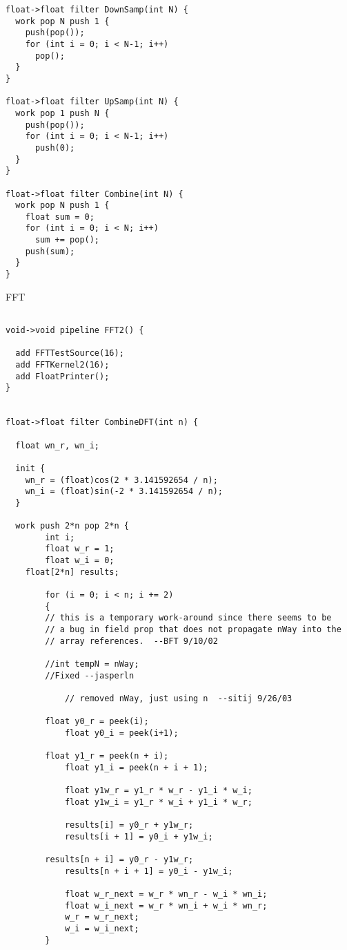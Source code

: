 \begin{scriptsize}
\begin{verbatim}
float->float filter DownSamp(int N) {
  work pop N push 1 {
    push(pop());
    for (int i = 0; i < N-1; i++)
      pop();
  }
}

float->float filter UpSamp(int N) {
  work pop 1 push N {
    push(pop());
    for (int i = 0; i < N-1; i++)
      push(0);
  }
}

float->float filter Combine(int N) {
  work pop N push 1 {
    float sum = 0;
    for (int i = 0; i < N; i++)
      sum += pop();
    push(sum);
  }
}

\end{verbatim}
\end{scriptsize}


FFT
\begin{scriptsize}
\begin{verbatim}

void->void pipeline FFT2() {

  add FFTTestSource(16);
  add FFTKernel2(16);
  add FloatPrinter();
}


float->float filter CombineDFT(int n) {

  float wn_r, wn_i;

  init {
    wn_r = (float)cos(2 * 3.141592654 / n);
    wn_i = (float)sin(-2 * 3.141592654 / n);
  }

  work push 2*n pop 2*n {
        int i;
        float w_r = 1;
        float w_i = 0;
    float[2*n] results;

        for (i = 0; i < n; i += 2)
        {
        // this is a temporary work-around since there seems to be
        // a bug in field prop that does not propagate nWay into the
        // array references.  --BFT 9/10/02

        //int tempN = nWay;
        //Fixed --jasperln

            // removed nWay, just using n  --sitij 9/26/03

        float y0_r = peek(i);
            float y0_i = peek(i+1);

        float y1_r = peek(n + i);
            float y1_i = peek(n + i + 1);

            float y1w_r = y1_r * w_r - y1_i * w_i;
            float y1w_i = y1_r * w_i + y1_i * w_r;

            results[i] = y0_r + y1w_r;
            results[i + 1] = y0_i + y1w_i;

        results[n + i] = y0_r - y1w_r;
            results[n + i + 1] = y0_i - y1w_i;

            float w_r_next = w_r * wn_r - w_i * wn_i;
            float w_i_next = w_r * wn_i + w_i * wn_r;
            w_r = w_r_next;
            w_i = w_i_next;
        }


\end{verbatim}
\end{scriptsize}

